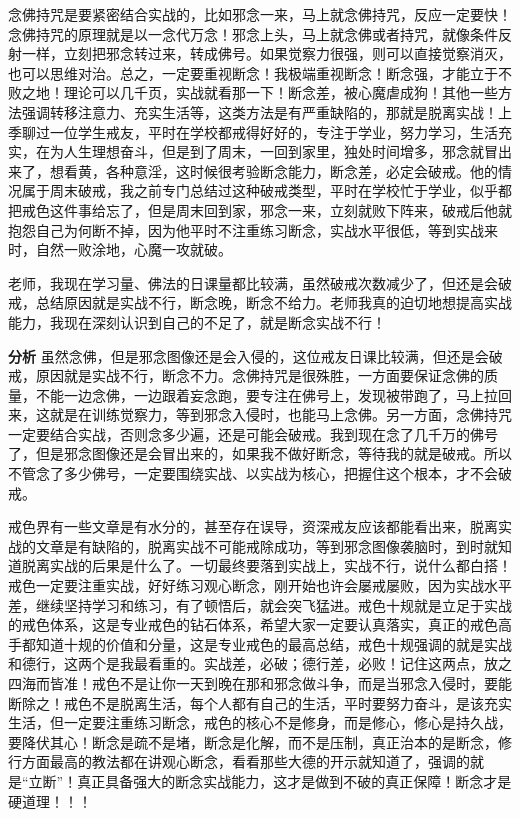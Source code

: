 念佛持咒是要紧密结合实战的，比如邪念一来，马上就念佛持咒，反应一定要快！念佛持咒的原理就是以一念代万念！邪念上头，马上就念佛或者持咒，就像条件反射一样，立刻把邪念转过来，转成佛号。如果觉察力很强，则可以直接觉察消灭，也可以思维对治。总之，一定要重视断念！我极端重视断念！断念强，才能立于不败之地！理论可以几千页，实战就看那一下！断念差，被心魔虐成狗！其他一些方法强调转移注意力、充实生活等，这类方法是有严重缺陷的，那就是脱离实战！上季聊过一位学生戒友，平时在学校都戒得好好的，专注于学业，努力学习，生活充实，在为人生理想奋斗，但是到了周末，一回到家里，独处时间增多，邪念就冒出来了，想看黄，各种意淫，这时候很考验断念能力，断念差，必定会破戒。他的情况属于周末破戒，我之前专门总结过这种破戒类型，平时在学校忙于学业，似乎都把戒色这件事给忘了，但是周末回到家，邪念一来，立刻就败下阵来，破戒后他就抱怨自己为何断不掉，因为他平时不注重练习断念，实战水平很低，等到实战来时，自然一败涂地，心魔一攻就破。

\begin{case}
    老师，我现在学习量、佛法的日课量都比较满，虽然破戒次数减少了，但还是会破戒，总结原因就是实战不行，断念晚，断念不给力。老师我真的迫切地想提高实战能力，我现在深刻认识到自己的不足了，就是断念实战不行！

    \textbf{分析} 虽然念佛，但是邪念图像还是会入侵的，这位戒友日课比较满，但还是会破戒，原因就是实战不行，断念不力。念佛持咒是很殊胜，一方面要保证念佛的质量，不能一边念佛，一边跟着妄念跑，要专注在佛号上，发现被带跑了，马上拉回来，这就是在训练觉察力，等到邪念入侵时，也能马上念佛。另一方面，念佛持咒一定要结合实战，否则念多少遍，还是可能会破戒。我到现在念了几千万的佛号了，但是邪念图像还是会冒出来的，如果我不做好断念，等待我的就是破戒。所以不管念了多少佛号，一定要围绕实战、以实战为核心，把握住这个根本，才不会破戒。
\end{case}

戒色界有一些文章是有水分的，甚至存在误导，资深戒友应该都能看出来，脱离实战的文章是有缺陷的，脱离实战不可能戒除成功，等到邪念图像袭脑时，到时就知道脱离实战的后果是什么了。一切最终要落到实战上，实战不行，说什么都白搭！戒色一定要注重实战，好好练习观心断念，刚开始也许会屡戒屡败，因为实战水平差，继续坚持学习和练习，有了顿悟后，就会突飞猛进。戒色十规就是立足于实战的戒色体系，这是专业戒色的钻石体系，希望大家一定要认真落实，真正的戒色高手都知道十规的价值和分量，这是专业戒色的最高总结，戒色十规强调的就是实战和德行，这两个是我最看重的。实战差，必破；德行差，必败！记住这两点，放之四海而皆准！戒色不是让你一天到晚在那和邪念做斗争，而是当邪念入侵时，要能断除之！戒色不是脱离生活，每个人都有自己的生活，平时要努力奋斗，是该充实生活，但一定要注重练习断念，戒色的核心不是修身，而是修心，修心是持久战，要降伏其心！断念是疏不是堵，断念是化解，而不是压制，真正治本的是断念，修行方面最高的教法都在讲观心断念，看看那些大德的开示就知道了，强调的就是“立断”！真正具备强大的断念实战能力，这才是做到不破的真正保障！断念才是硬道理！！！

